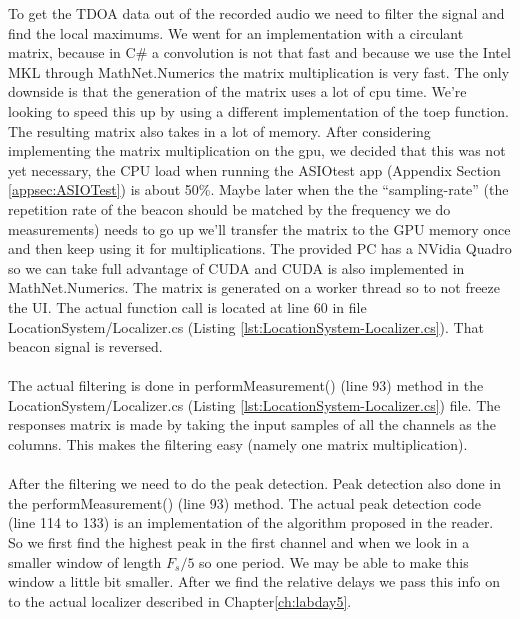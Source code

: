 \documentclass[final]{scrreprt} %
\begin{document}
To get the TDOA data out of the recorded audio we need to filter the signal and find the local maximums.
We went for an implementation with a circulant matrix, because in C\# a convolution is not that fast and because we use the Intel MKL through MathNet.Numerics the matrix multiplication is very fast.
The only downside is that the generation of the matrix uses a lot of cpu time.
We're looking to speed this up by using a different implementation of the toep function.
The resulting matrix also takes in a lot of memory.
After considering implementing the matrix multiplication on the gpu, we decided that this was not yet necessary, the CPU load when running the ASIOtest app (Appendix Section \ref{appsec:ASIOTest}) is about 50\%.
Maybe later when the the ``sampling-rate'' (the repetition rate of the beacon should be matched by the frequency we do measurements) needs to go up we'll transfer the matrix to the GPU memory once and then keep using it for multiplications.
The provided PC has a NVidia Quadro so we can take full advantage of CUDA and CUDA is also implemented in MathNet.Numerics.
The matrix is generated on a worker thread so to not freeze the UI.
The actual function call is located at line 60 in file LocationSystem/Localizer.cs (Listing \ref{lst:LocationSystem-Localizer.cs}).
That beacon signal is reversed.
\\ \\
The actual filtering is done in performMeasurement() (line 93) method in the LocationSystem/Localizer.cs (Listing \ref{lst:LocationSystem-Localizer.cs}) file.
The responses matrix is made by taking the input samples of all the channels as the columns. 
This makes the filtering easy (namely one matrix multiplication).
\\ \\
After the filtering we need to do the peak detection. Peak detection also done in the performMeasurement() (line 93) method.
The actual peak detection code (line 114 to 133) is an implementation of the algorithm proposed in the reader.
So we first find the highest peak in the first channel and when we look in a smaller window of length $F_s/5$ so one period.
We may be able to make this window a little bit smaller.
After we find the relative delays we pass this info on to the actual localizer described in Chapter\ref{ch:labday5}.
\end{document}
